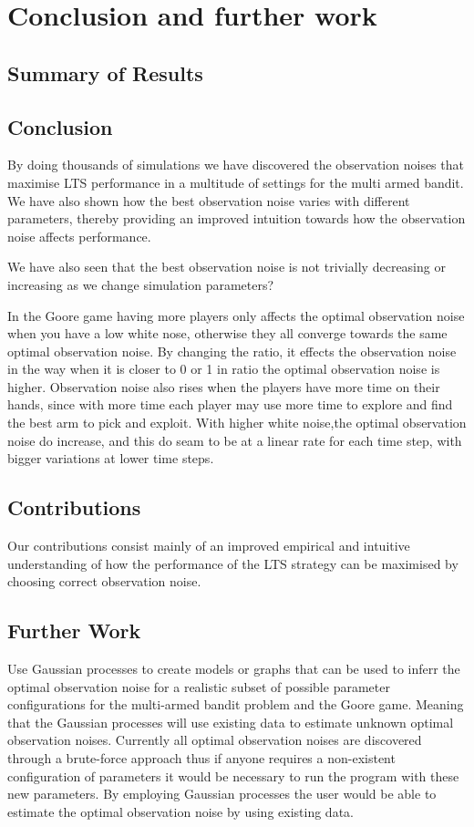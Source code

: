 \chapter{Conclusion and further work}
\label{ch:conclusion}

\section{Summary of Results}

\section{Conclusion}

By doing thousands of simulations we have discovered the observation noises that maximise LTS performance in a multitude of settings for the multi armed bandit.
We have also shown how the best observation noise varies with different parameters, thereby providing an improved intuition towards how the observation noise affects performance.

We have also seen that the best observation noise is not trivially decreasing or increasing as we change simulation parameters?

In the Goore game having more players only affects the optimal observation noise when you have a low white nose,
otherwise they all converge towards the same optimal observation noise. By changing the ratio, it effects the observation
noise in the way when it is closer to 0 or 1 in ratio the optimal observation noise is higher.
Observation noise also rises when the players have more time on their hands, since with more time each player may use more time 
to explore and find the best arm to pick and exploit. With higher white noise,the optimal observation noise do 
increase, and this do seam to be at a linear rate for each time step, with bigger variations at lower time steps.

\section{Contributions}
Our contributions consist mainly of an improved empirical and intuitive understanding of how the performance of the LTS strategy can be maximised by choosing correct observation noise.


\section{Further Work}
Use Gaussian processes to create models or graphs that can be used to inferr the optimal observation noise for a realistic subset of possible parameter configurations for the multi-armed bandit problem and the Goore game. Meaning that the Gaussian processes will use existing data to estimate unknown optimal observation noises. Currently all optimal observation noises are discovered through a brute-force approach thus if anyone requires a non-existent configuration of parameters it would be necessary to run the program with these new parameters. By employing Gaussian processes the user would be able to estimate the optimal observation noise by using existing data.

